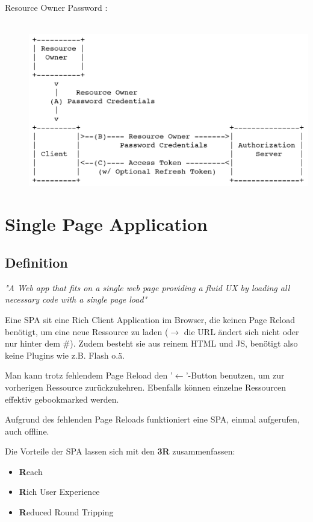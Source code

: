 \documentclass[a4paper, 11pt]{article}
\begin{document}
\begin{description}
	\item[Resource Owner Password :] \mbox{}\\
			\includegraphics[keepaspectratio=true,height=15\baselineskip]{pw_cred.PNG}
\end{description}

\section{Single Page Application}
\subsection{Definition}
\begin{center}
	\textit{"A Web app that fits on a single web page providing a fluid UX by loading all necessary code with a single page load"}
\end{center}

\noindent Eine SPA sit eine Rich Client Application im Browser, die keinen Page Reload benötigt, um eine neue Ressource zu laden ($\rightarrow$ die URL ändert sich nicht oder nur hinter dem \#). Zudem besteht sie aus reinem HTML und JS, benötigt also keine Plugins wie z.B. Flash o.ä.

Man kann trotz fehlendem Page Reload den '$\leftarrow$'-Button benutzen, um zur vorherigen Ressource zurückzukehren. Ebenfalls können einzelne Ressourcen effektiv gebookmarked werden.

Aufgrund des fehlenden Page Reloads funktioniert eine SPA, einmal aufgerufen, auch offline.
\vspace{10px}

\noindent Die Vorteile der SPA lassen sich mit den \textbf{3R} zusammenfassen:
\begin{itemize}
	\item \textbf{R}each
	\item \textbf{R}ich User Experience
	\item \textbf{R}educed Round Tripping
\end{itemize}
\end{document}
